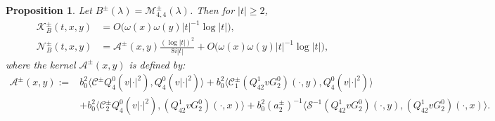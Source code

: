 \documentclass[reqno]{amsart}
\newtheorem{proposition}[theorem]{Proposition}
\numberwithin{equation}{section}
\begin{document}
\begin{proposition}\label{prop_second_1}  
	Let $B^\pm(\lambda)= \mathcal{M}_{4,4}^{\pm}(\lambda)$. Then  
 for $|t|\geq 2$, 
\begin{align*}
\mathcal{K}_{B}^\pm(t,x,y)&=O\bigl(\omega(x)\omega(y)|t|^{-1} \log|t|\bigr),\nonumber\\
\mathcal{N}_{B}^\pm(t,x,y)&=	\mathcal{A}^\pm(x,y)\frac{(\log|t|)^2}{8i|t|}+{O}\bigl(\omega(x)\omega(y)|t|^{-1}\log|t|\bigr), 
	\end{align*} 
	where the  kernel $\mathcal{A}^\pm(x,y)$ is defined by:
	\begin{align}\label{eq:mathcal_A_pm}
		\mathcal{A}^\pm(x,y) :={}& b_0^2 \langle \mathcal{C}^\pm Q_4^0(v |\cdot|^2),  Q_4^0(v |\cdot|^2)\rangle 
		+ b_0^2 \langle  \mathcal{C}_1^\pm (Q_{42}^1 v G_2^0)(\cdot,y),  Q_4^0(v |\cdot|^2)\rangle  \nonumber\\
		&+ b_0^2 \langle  \mathcal{C}_2^\pm Q_4^0(v |\cdot|^2),  (Q_{42}^1 v G_2^0)(\cdot,x)\rangle + b_0^2 (a_2^\pm)^{-1} \bigl\langle  \mathcal{S}^{-1} (Q_{42}^1 v G_2^0)(\cdot,y), (Q_{42}^1 v G_2^0)(\cdot,x) \bigr\rangle.
	\end{align}
\end{proposition}  
\end{document}
